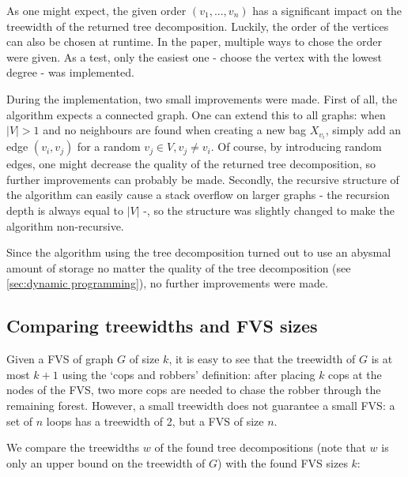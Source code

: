 As one might expect, the given order $(v_1,...,v_n)$ has a significant impact on the treewidth of the returned tree decomposition. Luckily, the order of the vertices can also be chosen at runtime. In the paper, multiple ways to chose the order were given. As a test, only the easiest one - choose the vertex with the lowest degree - was implemented.

During the implementation, two small improvements were made. First of all, the algorithm expects a connected graph. One can extend this to all graphs: when $|V| > 1$ and no neighbours are found when creating a new bag $X_{v_i}$, simply add an edge $(v_i,v_j)$ for a random $v_j \in V, v_j \neq v_i$. Of course, by introducing random edges, one might decrease the quality of the returned tree decomposition, so further improvements can probably be made.
Secondly, the recursive structure of the algorithm can easily cause a stack overflow on larger graphs - the recursion depth is always equal to $|V|$ -, so the structure was slightly changed to make the algorithm non-recursive.

Since the algorithm using the tree decomposition turned out to use an abysmal amount of storage no matter the quality of the tree decomposition (see \ref{sec:dynamic programming}), no further improvements were made. 


\subsection{Comparing treewidths and FVS sizes} \label{sec:treewidth3}
Given a FVS of graph $G$ of size $k$, it is easy to see that the treewidth of $G$ is at most $k+1$ using the `cops and robbers' definition: after placing $k$ cops at the nodes of the FVS, two more cops are needed to chase the robber through the remaining forest. However, a small treewidth does not guarantee a small FVS: a set of $n$ loops has a treewidth of 2, but a FVS of size $n$.

We compare the treewidths $w$ of the found tree decompositions (note that $w$ is only an upper bound on the treewidth of $G$) with the found FVS sizes $k$:

